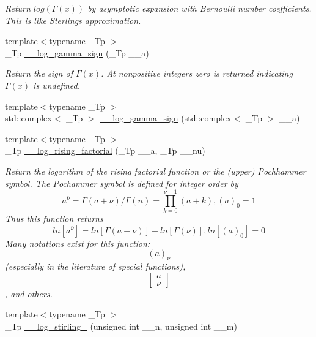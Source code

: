 \begin{DoxyCompactItemize}
\begin{DoxyCompactList}\small\item\em Return $log(\Gamma(x))$ by asymptotic expansion with Bernoulli number coefficients. This is like Sterling\textquotesingle{}s approximation. \end{DoxyCompactList}\item 
{\footnotesize template$<$typename \+\_\+\+Tp $>$ }\\\+\_\+\+Tp \hyperlink{namespacestd_1_1____detail_ab17ef141874b20a302d5c142cf304542}{\+\_\+\+\_\+log\+\_\+gamma\+\_\+sign} (\+\_\+\+Tp \+\_\+\+\_\+a)
\begin{DoxyCompactList}\small\item\em Return the sign of $ \Gamma(x) $. At nonpositive integers zero is returned indicating $ \Gamma(x) $ is undefined. \end{DoxyCompactList}\item 
{\footnotesize template$<$typename \+\_\+\+Tp $>$ }\\std\+::complex$<$ \+\_\+\+Tp $>$ \hyperlink{namespacestd_1_1____detail_a4c87b679d9fa1ac20ebe3cb85becb266}{\+\_\+\+\_\+log\+\_\+gamma\+\_\+sign} (std\+::complex$<$ \+\_\+\+Tp $>$ \+\_\+\+\_\+a)
\item 
{\footnotesize template$<$typename \+\_\+\+Tp $>$ }\\\+\_\+\+Tp \hyperlink{namespacestd_1_1____detail_a48998bae6619c9f63574af354b205074}{\+\_\+\+\_\+log\+\_\+rising\+\_\+factorial} (\+\_\+\+Tp \+\_\+\+\_\+a, \+\_\+\+Tp \+\_\+\+\_\+nu)
\begin{DoxyCompactList}\small\item\em Return the logarithm of the rising factorial function or the (upper) Pochhammer symbol. The Pochammer symbol is defined for integer order by \[ a^{\overline{\nu}} = \Gamma(a + \nu) / \Gamma(n) = \prod_{k=0}^{\nu-1} (a + k), (a)_0 = 1 \] Thus this function returns \[ ln[a^{\overline{\nu}}] = ln[\Gamma(a + \nu)] - ln[\Gamma(\nu)], ln[(a)_0] = 0 \] Many notations exist for this function\+: \[ (a)_\nu \] (especially in the literature of special functions), \[ \left[ \begin{array}{c} a \\ \nu \end{array} \right] \], and others. \end{DoxyCompactList}\item 
{\footnotesize template$<$typename \+\_\+\+Tp $>$ }\\\+\_\+\+Tp \hyperlink{namespacestd_1_1____detail_a4924c5c0666c33328d6276b5dbbdfad5}{\+\_\+\+\_\+log\+\_\+stirling\+\_} (unsigned int \+\_\+\+\_\+n, unsigned int \+\_\+\+\_\+m)

\end{DoxyCompactItemize}

